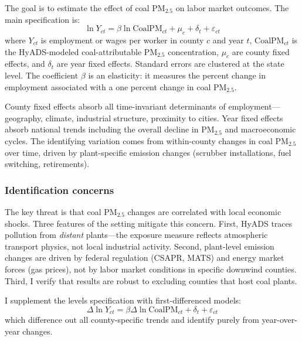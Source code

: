 \documentclass[12pt]{article}
\begin{document}
The goal is to estimate the effect of coal PM$_{2.5}$ on labor market outcomes. The main specification is:
\begin{equation}
\ln Y_{ct} = \beta \ln \text{CoalPM}_{ct} + \mu_c + \delta_t + \varepsilon_{ct}
\label{eq:main}
\end{equation}
where $Y_{ct}$ is employment or wages per worker in county $c$ and year $t$, $\text{CoalPM}_{ct}$ is the HyADS-modeled coal-attributable PM$_{2.5}$ concentration, $\mu_c$ are county fixed effects, and $\delta_t$ are year fixed effects. Standard errors are clustered at the state level. The coefficient $\beta$ is an elasticity: it measures the percent change in employment associated with a one percent change in coal PM$_{2.5}$.

County fixed effects absorb all time-invariant determinants of employment---geography, climate, industrial structure, proximity to cities. Year fixed effects absorb national trends including the overall decline in PM$_{2.5}$ and macroeconomic cycles. The identifying variation comes from within-county changes in coal PM$_{2.5}$ over time, driven by plant-specific emission changes (scrubber installations, fuel switching, retirements).

\subsubsection*{Identification concerns} The key threat is that coal PM$_{2.5}$ changes are correlated with local economic shocks. Three features of the setting mitigate this concern. First, HyADS traces pollution from \textit{distant} plants---the exposure measure reflects atmospheric transport physics, not local industrial activity. Second, plant-level emission changes are driven by federal regulation (CSAPR, MATS) and energy market forces (gas prices), not by labor market conditions in specific downwind counties. Third, I verify that results are robust to excluding counties that host coal plants.

I supplement the levels specification with first-differenced models:
\begin{equation}
\Delta \ln Y_{ct} = \beta \Delta \ln \text{CoalPM}_{ct} + \delta_t + \varepsilon_{ct}
\label{eq:fd}
\end{equation}
which difference out all county-specific trends and identify purely from year-over-year changes.
\end{document}
